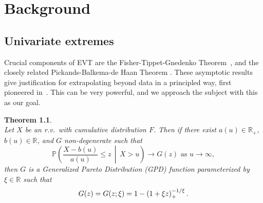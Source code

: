 \documentclass[11pt,twoside,openany]{book}
\newcommand{\reals}{\mathbb{R}}
\newtheorem{Theorem}{Theorem}
\numberwithin{Theorem}{chapter}
\numberwithin{Definition}{chapter}
\numberwithin{Lemma}{chapter}
\numberwithin{Algorithm}{chapter}
\numberwithin{equation}{chapter}
\begin{document}




\clearpage %


\chapter{Background}
\label{sec:background}


\section{Univariate extremes}

Crucial components of EVT are the
Fisher-Tippet-Gnedenko Theorem~\citep{coles2001introduction}, and the closely
related Pickands-Balkema-de Haan
Theorem \citep{balkema1974residual,pickands1975statistical}. These
asymptotic results give justification for extrapolating beyond data
in a principled way, first pioneered in~\cite{davison1990models}. This can be
very powerful, and we approach the subject with this as our goal.

\begin{Theorem}
  \label{thm:pbdhtheorem}\\
  Let $X$ be an r.v.\ with cumulative distribution $F$.
  Then if there exist $a(u) \in \mathbb{R}_{+}$, $b(u)\in\mathbb{R}$,
  and $G$ non-degenerate such that
  \[
    \mathbb{P}\left(\frac{X - b(u)}{a(u)}\leq z\,\middle|\,X>u\right)\rightarrow G(z)
    \text{ as }{u\rightarrow \infty},
  \]
  then $G$ is a Generalized Pareto Distribution (GPD) function parameterized
  by $\xi \in \reals$ such that
  \[
    G(z) = G(z;\xi)= 1 - \left(1 + \xi z\right)_{+}^{-1/\xi}.\\
  \]
\end{Theorem}
\end{document}
